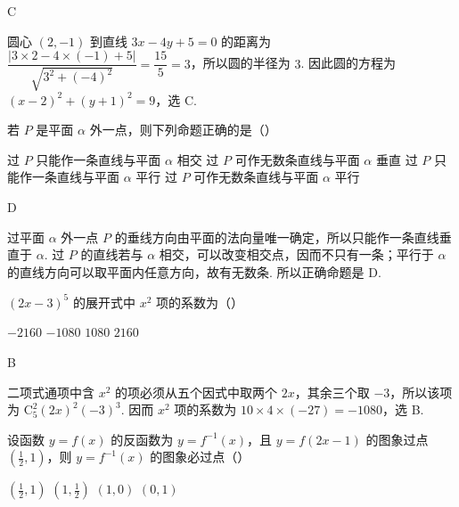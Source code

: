 \begin{answer}
C
\end{answer}

\begin{solution}
圆心 \((2,-1)\) 到直线 \(3x-4y+5=0\) 的距离为
\(\dfrac{|3\times2-4\times(-1)+5|}{\sqrt{3^2+(-4)^2}}=\dfrac{15}{5}=3\)，所以圆的半径为 \(3\). 因此圆的方程为 \((x-2)^2+(y+1)^2=9\)，选 C.
\end{solution}

\begin{problem}
若 \(P\) 是平面 \(\alpha\) 外一点，则下列命题正确的是（\quad）

\choices
    {过 \(P\) 只能作一条直线与平面 \(\alpha\) 相交}
    {过 \(P\) 可作无数条直线与平面 \(\alpha\) 垂直}
    {过 \(P\) 只能作一条直线与平面 \(\alpha\) 平行}
    {过 \(P\) 可作无数条直线与平面 \(\alpha\) 平行}
\end{problem}

\begin{answer}
D
\end{answer}

\begin{solution}
过平面 \(\alpha\) 外一点 \(P\) 的垂线方向由平面的法向量唯一确定，所以只能作一条直线垂直于 \(\alpha\). 过 \(P\) 的直线若与 \(\alpha\) 相交，可以改变相交点，因而不只有一条；平行于 \(\alpha\) 的直线方向可以取平面内任意方向，故有无数条. 所以正确命题是 D.
\end{solution}

\begin{problem}
\((2x - 3)^5\) 的展开式中 \(x^{2}\) 项的系数为（\quad）

\choices
    {\(-2160\)}
    {\(-1080\)}
    {\(1080\)}
    {\(2160\)}
\end{problem}

\begin{answer}
B
\end{answer}

\begin{solution}
二项式通项中含 \(x^2\) 的项必须从五个因式中取两个 \(2x\)，其余三个取 \(-3\)，所以该项为 \(\mathrm C_5^2(2x)^2(-3)^3\). 因而 \(x^2\) 项的系数为 \(10\times4\times(-27)=-1080\)，选 B.
\end{solution}

\begin{problem}
设函数 \( y = f(x) \) 的反函数为 \( y = f^{-1}(x) \)，且 \( y = f(2x - 1) \) 的图象过点 \( \left(\frac{1}{2}, 1\right) \)，则 \( y = f^{-1}(x) \) 的图象必过点（\quad）

\choices
    {\(\left(\frac{1}{2}, 1\right)\)}
    {\(\left(1, \frac{1}{2}\right)\)}
    {\((1,0)\)}
    {\((0,1)\)}
\end{problem}

